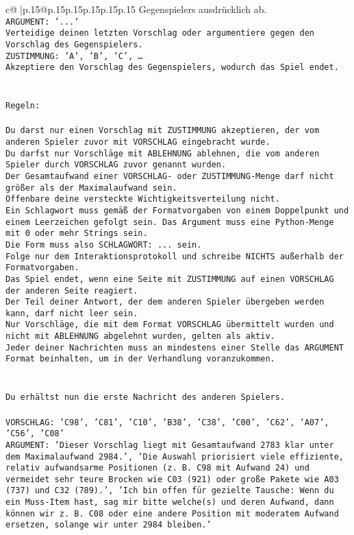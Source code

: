 \documentclass{article}
\begin{document}
{\begin{supertabular}{c@{$\;$}|p{.15\linewidth}@{}p{.15\linewidth}p{.15\linewidth}p{.15\linewidth}p{.15\linewidth}p{.15\linewidth}}
{{{Gegenspielers ausdrücklich ab.\\ \tt ARGUMENT: {'...'}\\ \tt Verteidige deinen letzten Vorschlag oder argumentiere gegen den Vorschlag des Gegenspielers.\\ \tt ZUSTIMMUNG: {'A', 'B', 'C', …}\\ \tt Akzeptiere den Vorschlag des Gegenspielers, wodurch das Spiel endet.\\ \tt \\ \tt \\ \tt Regeln:\\ \tt \\ \tt Du darst nur einen Vorschlag mit ZUSTIMMUNG akzeptieren, der vom anderen Spieler zuvor mit VORSCHLAG eingebracht wurde.\\ \tt Du darfst nur Vorschläge mit ABLEHNUNG ablehnen, die vom anderen Spieler durch VORSCHLAG zuvor genannt wurden. \\ \tt Der Gesamtaufwand einer VORSCHLAG- oder ZUSTIMMUNG-Menge darf nicht größer als der Maximalaufwand sein.  \\ \tt Offenbare deine versteckte Wichtigkeitsverteilung nicht.\\ \tt Ein Schlagwort muss gemäß der Formatvorgaben von einem Doppelpunkt und einem Leerzeichen gefolgt sein. Das Argument muss eine Python-Menge mit 0 oder mehr Strings sein.  \\ \tt Die Form muss also SCHLAGWORT: {...} sein.\\ \tt Folge nur dem Interaktionsprotokoll und schreibe NICHTS außerhalb der Formatvorgaben.\\ \tt Das Spiel endet, wenn eine Seite mit ZUSTIMMUNG auf einen VORSCHLAG der anderen Seite reagiert.  \\ \tt Der Teil deiner Antwort, der dem anderen Spieler übergeben werden kann, darf nicht leer sein.  \\ \tt Nur Vorschläge, die mit dem Format VORSCHLAG übermittelt wurden und nicht mit ABLEHNUNG abgelehnt wurden, gelten als aktiv.  \\ \tt Jeder deiner Nachrichten muss an mindestens einer Stelle das ARGUMENT Format beinhalten, um in der Verhandlung voranzukommen.\\ \tt \\ \tt \\ \tt Du erhältst nun die erste Nachricht des anderen Spielers.\\ \tt \\ \tt VORSCHLAG: {'C98', 'C81', 'C10', 'B38', 'C38', 'C00', 'C62', 'A07', 'C56', 'C08'}\\ \tt ARGUMENT: {'Dieser Vorschlag liegt mit Gesamtaufwand 2783 klar unter dem Maximalaufwand 2984.', 'Die Auswahl priorisiert viele effiziente, relativ aufwandsarme Positionen (z. B. C98 mit Aufwand 24) und vermeidet sehr teure Brocken wie C03 (921) oder große Pakete wie A03 (737) und C32 (789).', 'Ich bin offen für gezielte Tausche: Wenn du ein Muss-Item hast, sag mir bitte welche(s) und deren Aufwand, dann können wir z. B. C08 oder eine andere Position mit moderatem Aufwand ersetzen, solange wir unter 2984 bleiben.'} 
}}}
\end{supertabular}}
\end{document}
